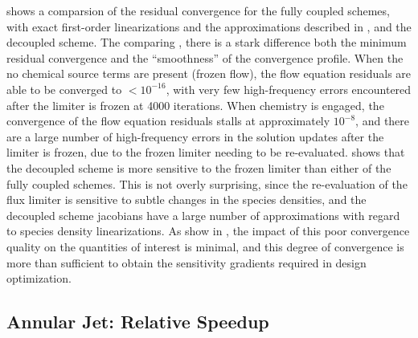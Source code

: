  shows a comparsion of the residual convergence for the
fully coupled schemes, with exact first-order linearizations and the
approximations described in , and
the decoupled scheme.  The comparing
, there is a stark
difference both the minimum residual convergence and the ``smoothness'' of the
convergence profile.  When the no chemical source terms are present (frozen
flow), the flow equation residuals are able to be converged to $ < 10^{-16}$,
with very few high-frequency errors encountered after the limiter is frozen at
4000 iterations.  When chemistry is engaged, the convergence of the flow
equation residuals stalls at approximately $10^{-8}$, and there are a large
number of high-frequency errors in the solution updates after the limiter is
frozen, due to the frozen limiter needing to be re-evaluated.
 shows that the decoupled scheme is more
sensitive to the frozen limiter than either of the fully coupled schemes.  This
is not overly surprising, since the re-evaluation of the flux limiter is
sensitive to subtle changes in the species densities, and the decoupled
scheme jacobians have a large number of approximations with regard to species
density linearizations.  As show in , the
impact of this poor convergence quality on the quantities of interest is
minimal, and this degree of convergence is more than sufficient to obtain the
sensitivity gradients required in design optimization.

\subsection{Annular Jet: Relative Speedup}


